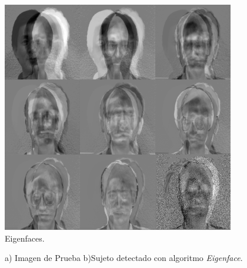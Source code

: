 \documentclass[letterpaper,12pt]{article}
\begin{document}
\begin{figure}[H]
 \centering
 \includegraphics[scale=0.9,keepaspectratio=true]{Figs/Eigenfaces.png}
\caption{Eigenfaces.}
 \label{Fig:Eigenfaces}
\end{figure}

\begin{figure}[h]
\centering
{}
\caption{a) Imagen de Prueba b)Sujeto detectado con algoritmo \emph{Eigenface}.}
\label{fig:2}
\end{figure} 
\end{document}
